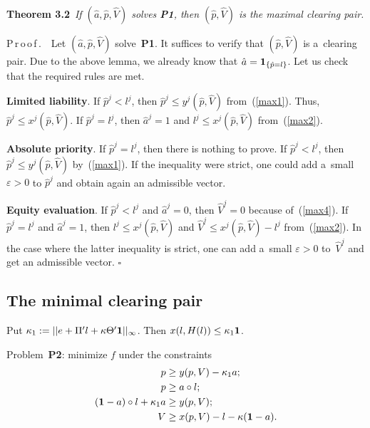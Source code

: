 \begin{multicols}{2}
\smallskip

\noindent
\textbf{Theorem 3.2}\
\textit{If $(\hat a, \hat p, \hat V)$ solves {\bf P1}, then $(\hat p, \hat V)$ is the maximal clearing pair.}


\smallskip

\noindent
P\,r\,o\,o\,f\,.\ \ 
Let $(\hat a, \hat p, \hat V)$ solve~\textbf{P1}. 
It suffices to verify that $(\hat p, \hat V)$ is a~clearing pair.
 Due to the above lemma, we already know that $\hat{a} = {\bf 1}_{\{\hat p = l\}}$. Let us check that the required rules are met. 

\smallskip

\noindent
\textbf{Limited liability}. If $\hat p^j < l^j$, 
then $\hat p^j \leq y^j(\hat  p,\hat  V)$ from~(\ref{max1}). 
Thus, $\hat p^j \leq x^j(\hat  p,\hat  V)$. If $\hat p^j = l^j$, then $\hat a^j = 1$ and  $l^j \leq  x^j(\hat  p,\hat  V)$ from~(\ref{max2}).

\smallskip

 \noindent
 \textbf{Absolute priority}. 
 If $\hat p^j = l^j$, then there is nothing to prove. If $\hat p^j < l^j$, then 
 $\hat p^j \leq y^j(\hat  p,\hat  V)$ by~(\ref{max1}). If the inequality were strict, one could add a~small $\varepsilon>0$ to $\hat p^j$ 
 and obtain again an admissible vector.

\smallskip

\noindent
\textbf{Equity evaluation}. If $\hat p^j < l^j$ and $\hat a^j = 0$, then $\hat V^j = 0$ 
because of~(\ref{max4}). If $\hat p^j = l^j$ and $\hat a^j = 1$, then  $l^j \leq x^j(\hat  p,\hat  V)$ and $\hat V^j 
\leq x^j(\hat  p,\hat  V) - l^j$ from~(\ref{max2}). In the case where the latter inequality is strict, one can add a~small $\varepsilon>0$ 
to~$\hat V^j$ and get an admissible vector. 
 \hfill$\square$

\subsection{The minimal clearing pair}

\noindent
Put  $\kappa_1 := || e + \Pi'l +\kappa \Theta' {\bf 1} ||_\infty $. Then $x(l,H(l))\leq \kappa_1 {\bf 1}$.

Problem~{\bf P2}: minimize $f$ under the constraints 
\begin{align}
 \label{min1}
 p &\geq y(p,V) - \kappa_1 a; \\
 \label{min2}
 p &\geq a \circ l; \\
\label{min3}
 ( {\bf 1} - a) \circ l  + \kappa_1 a &\geq y(p,V) ; \\
\label{min4}
 V& \geq x(p,V) - l - \kappa({\bf 1} - a).
\end{align}



\end{multicols}
